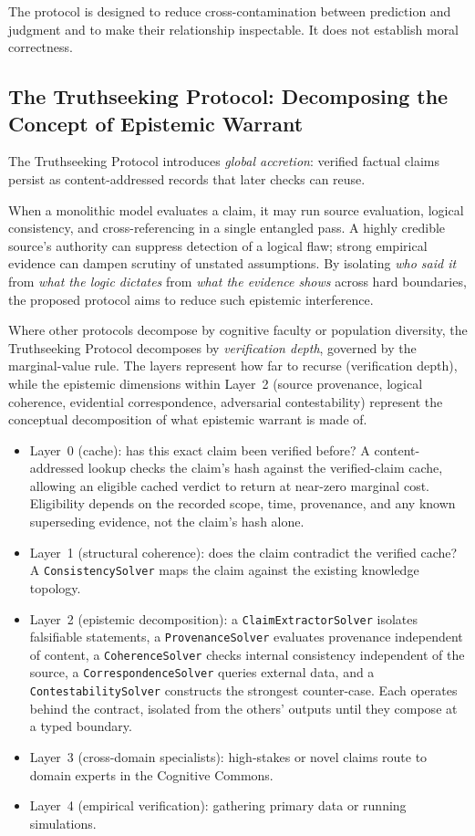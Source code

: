 \documentclass[11pt]{article}
\let\oldtexttt\texttt
\renewcommand{\texttt}[1]{\oldtexttt{\small #1}}
\begin{document}
The protocol is designed to reduce cross-contamination between prediction and judgment and to make their relationship inspectable. It does not establish moral correctness.

\subsection{The Truthseeking Protocol: Decomposing the Concept of Epistemic Warrant}
\label{sec:truth}

The Truthseeking Protocol introduces \emph{global accretion}: verified factual claims persist as content-addressed records that later checks can reuse.

When a monolithic model evaluates a claim, it may run source evaluation, logical consistency, and cross-referencing in a single entangled pass. A highly credible source's authority can suppress detection of a logical flaw; strong empirical evidence can dampen scrutiny of unstated assumptions. By isolating \emph{who said it} from \emph{what the logic dictates} from \emph{what the evidence shows} across hard boundaries, the proposed protocol aims to reduce such epistemic interference.

Where other protocols decompose by cognitive faculty or population diversity, the Truthseeking Protocol decomposes by \emph{verification depth}, governed by the marginal-value rule. The layers represent how far to recurse (verification depth), while the epistemic dimensions within Layer~2 (source provenance, logical coherence, evidential correspondence, adversarial contestability) represent the conceptual decomposition of what epistemic warrant is made of.
\begin{itemize}[leftmargin=1.5em]
\item Layer~0 (cache): has this exact claim been verified before? A content-addressed lookup checks the claim's hash against the verified-claim cache, allowing an eligible cached verdict to return at near-zero marginal cost. Eligibility depends on the recorded scope, time, provenance, and any known superseding evidence, not the claim's hash alone.
\item Layer~1 (structural coherence): does the claim contradict the verified cache? A \texttt{ConsistencySolver} maps the claim against the existing knowledge topology.
\item Layer~2 (epistemic decomposition): a \texttt{ClaimExtractorSolver} isolates falsifiable statements, a \texttt{ProvenanceSolver} evaluates provenance independent of content, a \texttt{CoherenceSolver} checks internal consistency independent of the source, a \texttt{CorrespondenceSolver} queries external data, and a \texttt{ContestabilitySolver} constructs the strongest counter-case. Each operates behind the contract, isolated from the others' outputs until they compose at a typed boundary.
\item Layer~3 (cross-domain specialists): high-stakes or novel claims route to domain experts in the Cognitive Commons.
\item Layer~4 (empirical verification): gathering primary data or running simulations.
\end{itemize}
\end{document}

